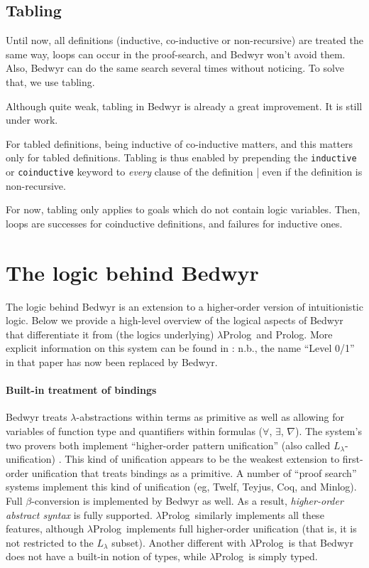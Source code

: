 \documentclass{article}
\newcommand{\lp}{$\lambda$Prolog}
\begin{document}
\subsection{Tabling}

Until now, all definitions (inductive, co-inductive or non-recursive)
are treated the same way, loops can occur in the proof-search, and Bedwyr
won't avoid them. Also, Bedwyr can do the same search several times without
noticing. To solve that, we use tabling.

Although quite weak, tabling in Bedwyr is already a great improvement.
It is still under work.

For tabled definitions, being inductive of co-inductive matters, and this 
matters only for tabled definitions.
Tabling is thus enabled by prepending the \texttt{inductive} or
\texttt{coinductive} keyword to \emph{every} clause of the definition |
even if the definition is non-recursive.

For now, tabling only applies to goals which do not contain logic variables.
Then, loops are successes for coinductive definitions,
and failures for inductive ones.


\section{The logic behind Bedwyr}
\label{logic}

The logic behind Bedwyr is an extension to a higher-order version of
intuitionistic logic.  Below we provide a high-level overview of the
logical aspects of Bedwyr that differentiate it from (the logics
underlying) \lp\ and Prolog.  More explicit information on this system
can be found in \cite{tiu05eshol}: n.b., the name ``Level 0/1'' in
that paper has now been replaced by Bedwyr.


\paragraph{Built-in treatment of bindings}
Bedwyr treats $\lambda$-abstractions within terms as primitive as well
as allowing for variables of function type and quantifiers within
formulas ($\forall$, $\exists$, $\nabla$).  The system's two provers
both implement ``higher-order pattern unification'' (also called
$L_\lambda$-unification) \cite{miller91jlc}.   This kind of unification
appears to be the weakest extension to first-order unification that
treats bindings as a primitive.  A number of ``proof search'' systems
implement this kind of unification (eg, Twelf, Teyjus, Coq, and
Minlog).  Full $\beta$-conversion is implemented by Bedwyr as well.
As a result, {\em higher-order abstract syntax} is fully supported.
\lp\ similarly implements all these features, although \lp\ implements
full higher-order unification (that is, it is not restricted to the
$L_\lambda$ subset).  Another different with \lp\ is that Bedwyr does
not have a built-in notion of types, while \lp\ is simply typed.
\end{document}
